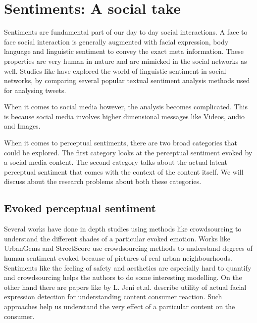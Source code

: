 \section{Sentiments: A social take}
Sentiments are fundamental part of our day to day social interactions. A face to face social interaction is generally augmented with facial expression, body language and linguistic sentiment to convey the exact meta information. These properties are very human in nature and are mimicked in the social networks as well. Studies like \cite{Joo2014b} have explored the world of linguistic sentiment in social networks, by comparing several popular textual sentiment analysis methods used for analysing tweets. 
\par
When it comes to social media however, the analysis becomes complicated. This is because social media involves higher dimensional messages like Videos, audio and Images. 
\par
When it comes to perceptual sentiments, there are two broad categories that could be explored. The first category looks at the perceptual sentiment evoked by a social media content. The second category talks about the actual latent perceptual sentiment that comes with the context of the content itself. We will discuss about the research problems about both these categories.

\subsection{ Evoked perceptual sentiment }
Several works have done in depth studies using methods like crowdsourcing to understand the different shades of a particular evoked emotion. Works like UrbanGems \cite{urbanGems} and StreetScore \cite{nikhil} use crowdsourcing methods to understand degrees of human sentiment evoked because of pictures of real urban neighbourhoods. Sentiments like the feeling of safety and aesthetics are especially hard to quantify and crowdsourcing helps the authors to do some interesting modelling. On the other hand there are papers like \cite{jeni20123d} by L. Jeni et.al. describe utility of actual facial expression detection for understanding content consumer reaction. Such approaches help us understand the very effect of a particular content on the consumer. 

